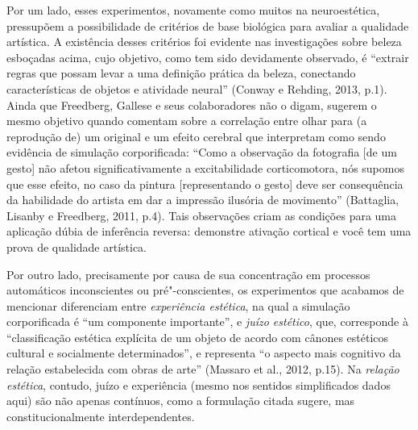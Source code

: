 Por um lado, esses experimentos, novamente como muitos na neuroestética,
pressupõem a possibilidade de critérios de base biológica para avaliar a
qualidade artística. A existência desses critérios foi evidente nas
investigações sobre beleza esboçadas acima, cujo objetivo, como tem sido
devidamente observado, é ``extrair regras que possam levar a uma
definição prática da beleza, conectando características de objetos e
atividade neural'' (Conway e Rehding, 2013, p.1). Ainda que Freedberg,
Gallese e seus colaboradores não o digam, sugerem o mesmo objetivo
quando comentam sobre a correlação entre olhar para (a reprodução de) um
original e um efeito cerebral que interpretam como sendo evidência de
simulação corporificada: ``Como a observação da fotografia {[}de um
gesto{]} não afetou significativamente a excitabilidade corticomotora,
nós supomos que esse efeito, no caso da pintura {[}representando o
gesto{]} deve ser consequência da habilidade do artista em dar a
impressão ilusória de movimento'' (Battaglia, Lisanby e Freedberg, 2011,
p.4). Tais observações criam as condições para uma aplicação dúbia de
inferência reversa: demonstre ativação cortical e você tem uma prova de
qualidade artística.

Por outro lado, precisamente por causa de sua concentração em processos
automáticos inconscientes ou pré"-conscientes, os experimentos que
acabamos de mencionar diferenciam entre \emph{experiência estética}, na
qual a simulação corporificada é ``um componente importante'', e
\emph{juízo estético}, que, corresponde à ``classificação estética
explícita de um objeto de acordo com cânones estéticos cultural e
socialmente determinados'', e representa ``o aspecto mais cognitivo da
relação estabelecida com obras de arte'' (Massaro et al., 2012, p.15).
Na \emph{relação estética}, contudo, juízo e experiência (mesmo nos
sentidos simplificados dados aqui) são não apenas contínuos, como a
formulação citada sugere, mas constitucionalmente interdependentes.

